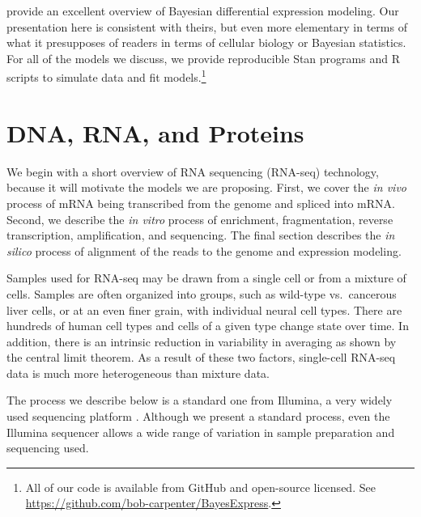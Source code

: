 \documentclass[11pt]{report}
\begin{document}
\cite{lewin2019bayesian} provide an excellent overview of Bayesian
differential expression modeling.  Our presentation here is consistent
with theirs, but even more elementary in terms of what it presupposes
of readers in terms of cellular biology or Bayesian statistics.  For
all of the models we discuss, we provide reproducible Stan programs
and R scripts to simulate data and fit models.\footnote{All of our
  code is available from GitHub and open-source licensed. See
  \url{https://github.com/bob-carpenter/BayesExpress}.}


\chapter{DNA, RNA, and Proteins}

We begin with a short overview of RNA sequencing (RNA-seq) technology,
because it will motivate the models we are proposing.  First, we cover
the \textit{in vivo} process of mRNA being transcribed from the genome
and spliced into mRNA.  Second, we describe the \textit{in vitro}
process of enrichment, fragmentation, reverse transcription,
amplification, and sequencing.  The final section describes the
\textit{in silico} process of alignment of the reads to the genome and
expression modeling.

Samples used for RNA-seq may be drawn from a single cell or from a
mixture of cells.  Samples are often organized into groups, such as
wild-type vs.\ cancerous liver cells, or at an even finer grain, with
individual neural cell types.  There are hundreds of human cell types
and cells of a given type change state over time.  In addition, there
is an intrinsic reduction in variability in averaging as shown by the
central limit theorem.  As a result of these two factors, single-cell
RNA-seq data is much more heterogeneous than mixture data.

The process we describe below is a standard one from Illumina, a very
widely used sequencing platform \cite{quail2008large}.  Although we
present a standard process, even the Illumina sequencer allows a wide
range of variation in sample preparation and sequencing used.
\end{document}
